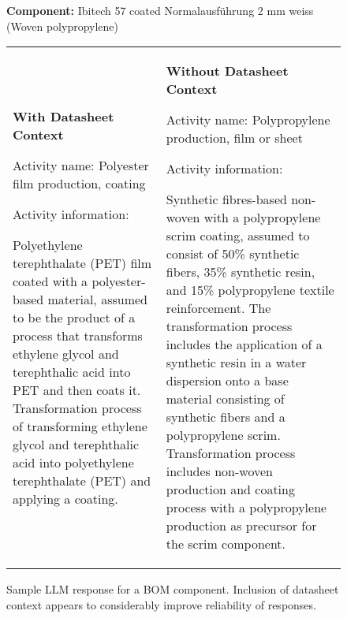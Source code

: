 \begin{figure*}[h!]
\centering
{\sffamily
\textbf{Component:} Ibitech 57 coated Normalausführung 2 mm weiss\\
(Woven polypropylene)
}
\begin{tabular}{p{7cm} p{7cm}}
\begin{custommdframed}

\textbf{With Datasheet Context}
\vspace{0.5em}

Activity name: Polyester film production, coating 

Activity information: 

Polyethylene terephthalate (PET) film coated with a polyester-based material, assumed to be the product of a process that transforms ethylene glycol and terephthalic acid into PET and then coats it. Transformation process of transforming ethylene glycol and terephthalic acid into polyethylene terephthalate (PET) and applying a coating.
\end{custommdframed}
 & 
\begin{custommdframed}
\centering
\textbf{Without Datasheet Context}
\vspace{0.5em}

 Activity name: Polypropylene production, film or sheet

Activity information: 

Synthetic fibres-based non-woven with a polypropylene scrim coating, assumed to consist of 50\% synthetic fibers, 35\% synthetic resin, and 15\% polypropylene textile reinforcement. The transformation process includes the application of a synthetic resin in a water dispersion onto a base material consisting of synthetic fibers and a polypropylene scrim.
Transformation process includes non-woven production and coating process with a polypropylene production as precursor for the scrim component.
\end{custommdframed}
\end{tabular}
\label{response}
\caption{Sample LLM response for a BOM component. Inclusion of datasheet context appears to considerably improve reliability of responses.}
\end{figure*}

